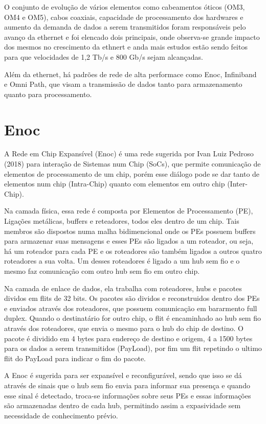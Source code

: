 \documentclass[a4paper,12pt]{article}
\begin{document}
O conjunto de evolução de vários elementos como cabeamentos óticos (OM3, OM4 e OM5), cabos coaxiais, capacidade de processamento dos hardwares e aumento da demanda de dados a serem transmitidos foram responsáveis pelo avanço da ethernet e foi elencado dois principais, onde observa-se grande impacto dos mesmos no crescimento da ethnert e anda mais estudos estão sendo feitos para que velocidades de 1,2 Tb/s e 800 Gb/s sejam alcançadas.

Além da ethernet, há padrões de rede de alta performace como Enoc, Infiniband e Omni Path, que visam a transmissão de dados tanto para armazenamento quanto para processamento.

\section{Enoc}
A Rede em Chip Expansível (Enoc) é uma rede sugerida por Ivan Luiz Pedroso (2018) para interação de Sistemas num Chip (SoCs), que permite comunicação de elementos de processamento de um chip, porém esse diálogo pode se dar tanto de elementos num chip (Intra-Chip) quanto com elementos em outro chip (Inter-Chip).

Na camada física, essa rede é composta por Elementos de Processamento (PE), Ligações metálicas, buffers e reteadores, todos eles dentro de um chip. Tais membros são dispostos numa malha bidimencional onde os PEs possuem buffers para armazenar suas mensagens e esses PEs são ligados a um roteador, ou seja, há um roteador para cada PE e os roteadores são também ligados a outros quatro roteadores a sua volta. Um desses roteadores é ligado a um hub sem fio e o mesmo faz comunicação com outro hub sem fio em outro chip.

Na camada de enlace de dados, ela trabalha com roteadores, hubs e pacotes dividos em flits de 32 bits. Os pacotes são dividos e reconstruidos dentro dos PEs e enviados através dos roteadores, que possuem comunicação em bararmento full duplex. Quando o destinatário for outro chip, o flit é encaminhado ao hub sem fio através dos roteadores, que envia o mesmo para o hub do chip de destino. O pacote é dividido em 4 bytes para endereço de destino e origem, 4 a 1500 bytes para os dados a serem transmitidos (PayLoad), por fim um flit repetindo o ultimo flit do PayLoad para indicar o fim do pacote.

A Enoc é sugerida para ser expansível e reconfigurável, sendo que isso se dá através de sinais que o hub sem fio envia para informar sua presença e quando esse sinal é detectado, troca-se informações sobre seus PEs e essas informações são armazenadas dentro de cada hub, permitindo assim a expasividade sem necessidade de conhecimento prévio.
\end{document}
